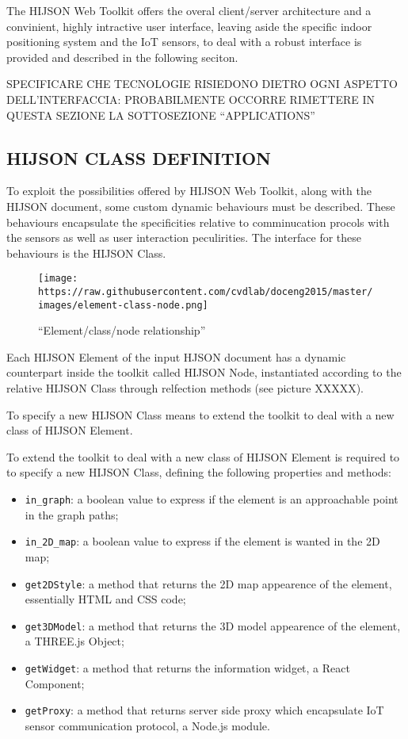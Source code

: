 \documentclass[]{article}
\begin{document}
The HIJSON Web Toolkit offers the overal client/server architecture and
a convinient, highly intractive user interface, leaving aside the
specific indoor positioning system and the IoT sensors, to deal with a
robust interface is provided and described in the following seciton.

SPECIFICARE CHE TECNOLOGIE RISIEDONO DIETRO OGNI ASPETTO
DELL'INTERFACCIA: PROBABILMENTE OCCORRE RIMETTERE IN QUESTA SEZIONE LA
SOTTOSEZIONE ``APPLICATIONS''

\subsection{HIJSON CLASS DEFINITION}\label{hijson-class-definition}

To exploit the possibilities offered by HIJSON Web Toolkit, along with
the HIJSON document, some custom dynamic behaviours must be described.
These behaviours encapsulate the specificities relative to comminucation
procols with the sensors as well as user interaction peculirities. The
interface for these behaviours is the HIJSON Class.

\begin{figure}[htbp]
\centering
\texttt{[image: https://raw.githubusercontent.com/cvdlab/doceng2015/master/images/element-class-node.png]}
\caption{``Element/class/node relationship''}
\end{figure}

Each HIJSON Element of the input HJSON document has a dynamic
counterpart inside the toolkit called HIJSON Node, instantiated
according to the relative HIJSON Class through relfection methods (see
picture XXXXX).

To specify a new HIJSON Class means to extend the toolkit to deal with a
new class of HIJSON Element.

To extend the toolkit to deal with a new class of HIJSON Element is
required to to specify a new HIJSON Class, defining the following
properties and methods:

\begin{itemize}
\item
  \texttt{in\_graph}: a boolean value to express if the element is an
  approachable point in the graph paths;
\item
  \texttt{in\_2D\_map}: a boolean value to express if the element is
  wanted in the 2D map;
\item
  \texttt{get2DStyle}: a method that returns the 2D map appearence of
  the element, essentially HTML and CSS code;
\item
  \texttt{get3DModel}: a method that returns the 3D model appearence of
  the element, a THREE.js Object;
\item
  \texttt{getWidget}: a method that returns the information widget, a
  React Component;
\item
  \texttt{getProxy}: a method that returns server side proxy which
  encapsulate IoT sensor communication protocol, a Node.js module.
\end{itemize}
\end{document}

